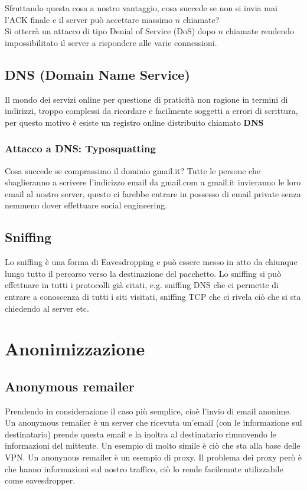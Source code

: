 Sfruttando questa cosa a nostro vantaggio, cosa succede se non si invia mai l'ACK finale e il server può accettare massimo $n$ chiamate? \\
Si otterrà un attacco di tipo Denial of Service (DoS) dopo $n$ chiamate rendendo impossibilitato il server a rispondere alle varie connessioni.

\subsection{DNS (Domain Name Service)}
Il mondo dei servizi online per questione di praticità non ragione in termini di indirizzi, troppo complessi da ricordare e facilmente soggetti a errori di scrittura, per questo motivo è esiste un registro online distribuito chiamato \textbf{DNS}

\subsubsection{Attacco a DNS: Typosquatting}
Cosa succede se comprassimo il dominio gmail.it?
Tutte le persone che sbaglieranno a scrivere l'indirizzo email da gmail.com a gmail.it invieranno le loro email al nostro server, questo ci farebbe entrare in possesso di email private senza nemmeno dover effettuare social engineering.

\subsection{Sniffing}
Lo sniffing è una forma di Eavesdropping e può essere messo in atto da chiunque lungo tutto il percorso verso la destinazione del pacchetto. Lo sniffing si può effettuare in tutti i protocolli già citati, e.g. sniffing DNS che ci permette di entrare a conoscenza di tutti i siti visitati, sniffing TCP che ci rivela ciò che si sta chiedendo al server etc.

\section{Anonimizzazione}

\subsection{Anonymous remailer}
Prendendo in considerazione il caso più semplice, cioè l'invio di email anonime.
Un anonymous remailer è un server che ricevuta un'email (con le informazione sul destinatario) prende questa email e la inoltra al destinatario rimuovendo le informazioni del mittente.
Un esempio di molto simile è ciò che sta alla base delle VPN.
Un anonynous remailer è un esempio di proxy. Il problema dei proxy però è che hanno informazioni sul nostro traffico, ciò lo rende facilemnte utilizzabile come eavesdropper.

